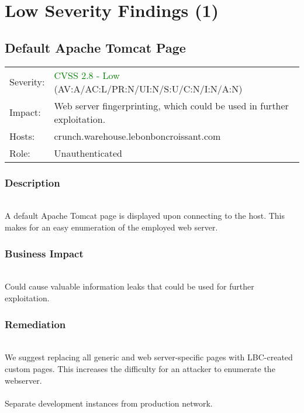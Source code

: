 \documentclass{article}
\begin{document}
\section{Low Severity Findings (1)}
\subsection{Default Apache Tomcat Page}\begin{table}[h]
\centering
\begin{tabular}{|l|l|}
	\rowcolor{green}
	\hline                  &                                                                         \\
	\hline Severity:        & \textcolor{green}{CVSS 2.8 - Low} (AV:A/AC:L/PR:N/UI:N/S:U/C:N/I:N/A:N) \\
	
	\hline Impact:          & Web server fingerprinting, which could be used in further exploitation. \\
	\hline Hosts:           & crunch.warehouse.lebonboncroissant.com                                  \\
	\hline Role:            & Unauthenticated                                                         \\
	\hline
\end{tabular}
\end{table}
\subsubsection*{Description} \\A default Apache Tomcat page is displayed upon connecting to the host. This makes for an easy enumeration of the employed web server.\subsubsection*{Business Impact}\\ Could cause valuable information leaks that could be used for further exploitation.\subsubsection*{Remediation}\\We suggest replacing all generic and web server-specific pages with LBC-created custom pages. This increases the difficulty for an attacker to enumerate the webserver.
\\ \\
Separate development instances from production network.
\end{document}
